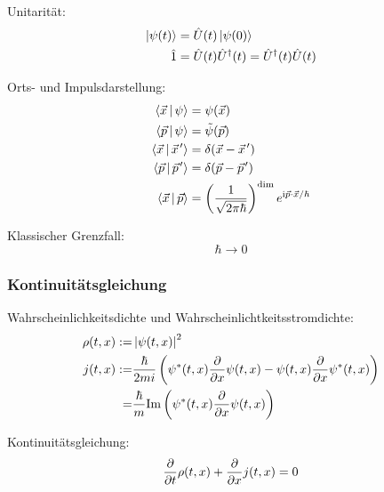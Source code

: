 \documentclass[11pt]{article}
\numberwithin{equation}{section}
\begin{document}
			\noindent
			Unitarität:
			\begin{equation}
				\begin{aligned}
					\Ket{\psi(t)} &= \hat{U}(t) \Ket{\psi(0)} \\
					\hat{1} &= \hat{U}(t)\hat{U}^\dagger(t) = \hat{U}^\dagger(t)\hat{U}(t) \\
				\end{aligned}
			\end{equation}

			\noindent
			Orts- und Impulsdarstellung:
			\begin{equation}
				\begin{aligned}
					\Braket{\vec{x} | \psi} &= \psi(\vec{x}) \\
					\Braket{\vec{p} | \psi} &= \tilde{\psi}(\vec{p}) \\
					\Braket{\vec{x} | \pvec{x}'} &= \delta(\vec{x} - \pvec{x}') \\
					\Braket{\vec{p} | \pvec{p}'} &= \delta(\vec{p} - \pvec{p}') \\
					\Braket{\vec{x} | \vec{p}} &= \left( \frac{1}{\sqrt{2\pi\hbar}} \right)^\mathrm{dim} e^{\i \vec{p}\cdot\vec{x} / \hbar} \\
				\end{aligned}
			\end{equation}

			\noindent
			Klassischer Grenzfall:
			\begin{equation}
				\hbar \rightarrow 0
			\end{equation}

			\subsubsection{Kontinuitätsgleichung}
				\noindent
				Wahrscheinlichkeitsdichte und Wahrscheinlichtkeitsstromdichte:
				\begin{equation}
					\begin{aligned}
						\rho(t,x) :=& \left|\psi(t,x)\right|^2 \\
						j(t,x) :=& \frac{\hbar}{2mi}\left(
							\psi^*(t,x)\frac{\partial }{\partial x}\psi(t,x) - \psi(t,x)\frac{\partial }{\partial x}\psi^*(t,x)
						\right) \\
						=& \frac{\hbar}{m} \mathrm{Im}\left(
							\psi^*(t,x) \frac{\partial }{\partial x}\psi(t,x)
						\right)\\
					\end{aligned}
				\end{equation}

				\noindent
				Kontinuitätsgleichung:
				\begin{equation}
					\frac{\partial }{\partial t}\rho(t,x) + \frac{\partial }{\partial x}j(t,x) = 0
				\end{equation}
\end{document}
